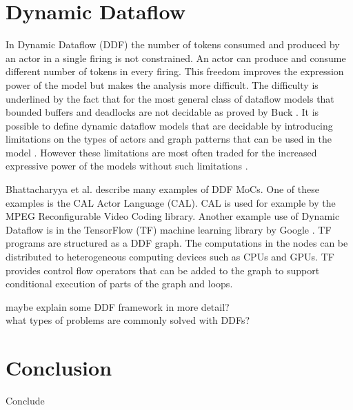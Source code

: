 \documentclass[conference,a4paper]{IEEEtran}
\begin{document}
\section{Dynamic Dataflow}
In Dynamic Dataflow (DDF) the number of tokens consumed and produced by an actor
in a single firing is not constrained. An actor can produce and consume
different number of tokens in every firing. This freedom improves the expression
power of the model but makes the analysis more difficult. The difficulty is
underlined by the fact that for the most general class of dataflow models that
bounded buffers and deadlocks are not decidable as proved by Buck
\cite{buck1993scheduling}. It is possible to define dynamic dataflow models that
are decidable by introducing limitations on the types of actors and graph
patterns that can be used in the model \cite{bhattacharyya2013handbook,
gao1992well}. However these limitations are most often traded for the increased
expressive power of the models without such limitations
\cite{bhattacharyya2013handbook}.

Bhattacharyya et al. \cite{bhattacharyya2013handbook} describe many examples of
DDF MoCs. One of these examples is the CAL Actor Language (CAL). CAL is used for
example by the MPEG Reconfigurable Video Coding library. Another example use of
Dynamic Dataflow is in the TensorFlow (TF) machine learning library by Google
\cite{tensorflow2015-whitepaper}. TF programs are structured as a DDF graph. The
computations in the nodes can be distributed to heterogeneous computing devices
such as CPUs and GPUs. TF provides control flow operators that can be added to
the graph to support conditional execution of parts of the graph and loops.

maybe explain some DDF framework in more detail? \\
what types of problems are commonly solved with DDFs?

\section{Conclusion}
Conclude

%



\end{document}
